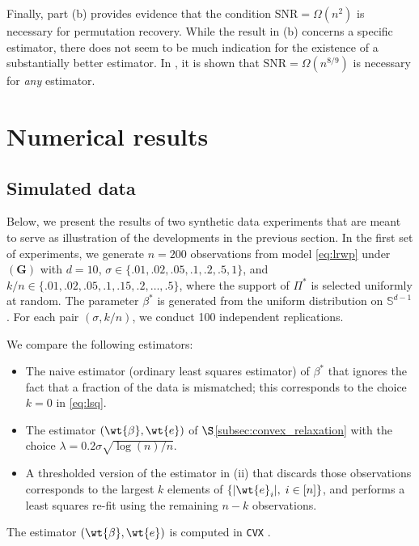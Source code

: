 \documentclass[11pt]{article}
\begin{document}
Finally, part (b) provides evidence that the condition $\text{SNR} = \Omega(n^2)$ is necessary for permutation recovery. While the result in (b) concerns a specific estimator, there does not seem to be much indication for the existence of a substantially better estimator. In \cite{Pananjady2016}, it is shown that $\text{SNR} = \Omega(n^{8/9})$ is necessary for \emph{any} estimator.     



\section{Numerical results}\label{sec:numericalresults}

\subsection{Simulated data}

Below, we present the results of two synthetic data experiments that are meant to serve as illustration of the developments in the previous section. In the first set of experiments, we generate $n = 200$ observations from model \eqref{eq:lrwp} under $(\textbf{G})$ with $d = 10$,
$\sigma \in \{.01, .02, .05, .1, .2, .5, 1\}$, and $k/n \in \{.01, .02, .05, .1, .15, .2, \ldots, .5\}$, where the support of $\Pi^*$ is selected uniformly at random. The parameter $\beta^*$ is generated from the uniform distribution on $\mathbb{S}^{d-1}$. For each pair $(\sigma, k/n)$, we conduct 100 independent replications.  

We compare the following estimators:
\begin{itemize}
\item[(i)] The naive estimator (ordinary least squares estimator) of $\beta^*$ that ignores the fact that a fraction of the data is mismatched; this corresponds to the choice $k = 0$ in \eqref{eq:lsq}.
\item[(ii)] The estimator $(\wt{\beta}, \wt{e})$ of $\S$\ref{subsec:convex_relaxation} with the choice $\lambda = 0.2 \sigma \sqrt{\log(n) / n}$.
\item[(iii)] A thresholded version of the estimator in (ii) that discards those observations
             corresponds to the largest $k$ elements of $\{|\wt{e}_i|, \; i \in [n]\}$, and performs a least squares re-fit using the remaining $n-k$ observations.   
\end{itemize}
The estimator $(\wt{\beta}, \wt{e})$ is computed in \texttt{CVX} \cite{cvx}.  
\end{document}
